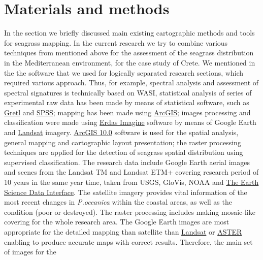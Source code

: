 \documentclass[11pt]{article}
\begin{document}
\section{Materials and methods}\label{sec:3}\label{page-22}

In the section  we briefly discussed main existing cartographic methods and tools for seagrass mapping. In the current  research we try to combine various techniques from mentioned above for the assessment of the seagrass distribution in the Mediterranean environment, for the case study of Crete. We mentioned in the  the software that we used for logically separated research sections, which required various approach. Thus, for example,  spectral analysis and assessment of spectral signatures is technically based on \ac{WASI}, statistical analysis of series of experimental raw data has been made by means of statistical software, such as \href{http://gretl.sourceforge.net/}{Gretl} and \href{http://www.spss.com/}{SPSS}; mapping has been made using  \href{http://www.esri.com/software/arcgis/index.html}{ArcGIS}; images processing and classification were made using \href{http://www.erdas.com/products/ERDASIMAGINE/ERDASIMAGINE/Details.aspx}{Erdas Imagine} software by means of Google Earth and  \href{http://landsat.gsfc.nasa.gov/}{Landsat} imagery.
\href{http://www.esri.com/software/arcgis/index.html}{ArcGIS 10.0} software is used for the spatial analysis, general mapping and cartographic layout
presentation; the raster processing techniques are applied for the detection of seagrass spatial
distribution using supervised classification.
The research data include Google Earth aerial images and scenes from the \ac{Landsat TM} and \ac{Landsat ETM+}
covering research period of 10 years in the same year time, taken from \ac{USGS}, \ac{GloVis}, \ac{NOAA} and \href{http://glcfapp.glcf.umd.edu:8080/esdi/index.jsp}{The Earth Science Data Interface}. 
The satellite imagery provides
vital information of the most recent changes in \textit{P.oceanica} within the coastal areas, as well as the
condition (poor or destroyed).
The raster processing includes making mosaic-like covering for the whole research area. The Google
Earth images are most appropriate for the detailed mapping than satellite than \href{http://landsat.gsfc.nasa.gov/}{Landsat} or \href{http://asterweb.jpl.nasa.gov/}{ASTER} enabling to produce accurate maps with correct results. Therefore, the main set of images for the
\end{document}
